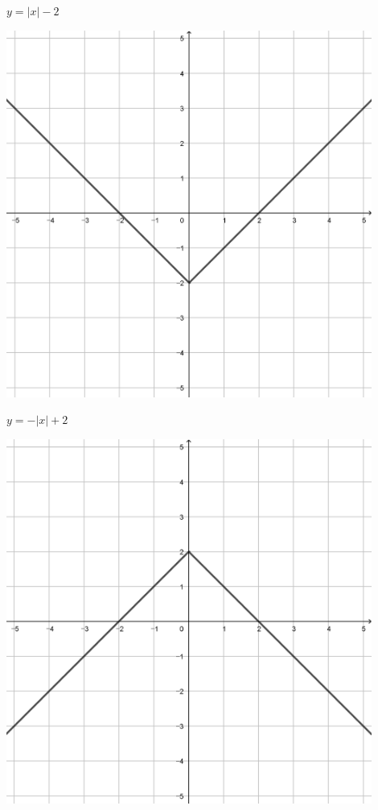 \documentclass[a4paper]{oblivoir}
\begin{document}
\begin{minipage}{0.45\textwidth}\centering
\(y=|x|-2\)
\par\bigskip\includegraphics[width=0.9\textwidth]{img/15-3}
\end{minipage}
\begin{minipage}{0.45\textwidth}\centering
\(y=-|x|+2\)
\par\bigskip\includegraphics[width=0.9\textwidth]{img/15-4}
\end{minipage}\bigskip\bigskip\par
\end{document}
